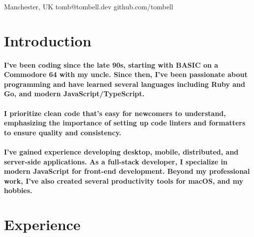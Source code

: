 \maketitle

\begin{center}
  \raisebox{0\height}{\small\faMapMarker} Manchester, UK
  \hspace{1 cm}
  \raisebox{-0.1\height}{\small\faEnvelope} tomb@tombell.dev
  \hspace{1 cm}
  \raisebox{-0.1\height}{\small\faGithubAlt} github.com/tombell
\end{center}

\section{Introduction}
\paragraph{I've been coding since the late 90s, starting with BASIC on a
Commodore 64 with my uncle. Since then, I've been passionate about programming
and have learned several languages including Ruby and Go, and modern
JavaScript/TypeScript.}

\paragraph{I prioritize clean code that's easy for newcomers to understand,
emphasizing the importance of setting up code linters and formatters to ensure
quality and consistency.}

\paragraph{I've gained experience developing desktop, mobile, distributed, and
server-side applications. As a full-stack developer, I specialize in modern
JavaScript for front-end development. Beyond my professional work, I've also
created several productivity tools for macOS, and my hobbies.}

\section{Experience}


